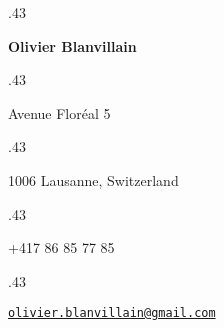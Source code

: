 \documentclass[margin, a4paper]{res}
\newcommand{\centered}[1]{\moveleft.43\hoffset\centerline{#1}}
\begin{document}
\centered{\LARGE\textbf{Olivier Blanvillain}}
\vspace{3pt}

\centered{Avenue Floréal 5}
\centered{1006 Lausanne, Switzerland}
\vspace{3pt}
\centered{+417 86 85 77 85}
\vspace{3pt}
\centered{\href{mailto:olivier.blanvillain@gmail.com}{\texttt{olivier.blanvillain@gmail.com}}}

\begin{resume}
  
\end{resume}
\end{document}
